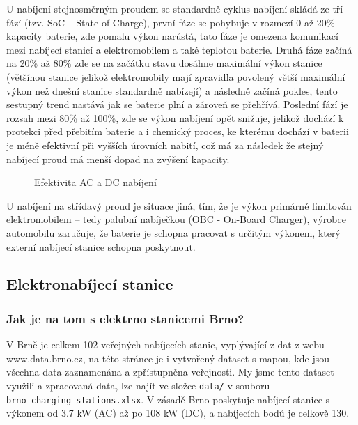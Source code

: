 \documentclass[a4paper,11pt]{article}
\begin{document}
U nabíjení stejnosměrným proudem se standardně cyklus nabíjení skládá ze tří fází (tzv. SoC -- State of Charge), první
fáze se pohybuje v rozmezí 0 až 20\% kapacity baterie, zde pomalu výkon narůstá, tato fáze je omezena komunikací
mezi nabíjecí stanicí a elektromobilem a také teplotou baterie. Druhá fáze začíná na 20\% až 80\% zde se na začátku
stavu dosáhne maximální výkon stanice (většínou stanice jelikož elektromobily mají zpravidla povolený větší maximální výkon
než dnešní stanice standardně nabízejí) a následně začíná pokles, tento sestupný trend nastává jak se baterie plní a
zároveň se přehřívá. Poslední fází je rozsah mezi 80\% až 100\%, zde se výkon nabíjení opět snižuje, jelikož
dochází k protekci před přebitím baterie a i chemický proces, ke kterému dochází v baterii je méně efektivní 
při vyšších úrovních nabití, což má za následek že stejný nabíjecí proud má menší dopad na zvýšení kapacity.\cite{nabijeci_krivka}

\begin{figure}[H]
    \centering
    \caption{Efektivita AC a DC nabíjení \cite{rozdil_mezi_ac_dc_nabijenim_graf}}
    \label{figure:ac-dc-charging-efficency}
\end{figure}

U nabíjení na střídavý proud je situace jiná, tím, že je výkon primárně limitován elektromobilem -- tedy palubní nabíječkou 
(OBC - On-Board Charger), výrobce automobilu zaručuje, že baterie je schopna pracovat s určitým výkonem, který externí
nabíjecí stanice schopna poskytnout. %

\subsection{Elektronabíjecí stanice}

\subsubsection{Jak je na tom s elektrno stanicemi Brno?}
V Brně je celkem 102 veřejných nabíjecích stanic, vyplývající z dat z webu www.data.brno.cz\cite{data_brno},
na této stránce je i vytvořený dataset s mapou, kde jsou všechna data zaznamenána a zpřístupněna veřejnosti.
My jsme tento dataset využili a zpracovaná data, lze najít ve složce \texttt{data/} v souboru \texttt{brno\_charging\_stations.xlsx}.
V zásadě Brno poskytuje nabíjecí stanice s výkonem od 3.7 kW (AC) až po 108 kW (DC), a nabíjecích bodů je 
celkově 130.
\end{document}
